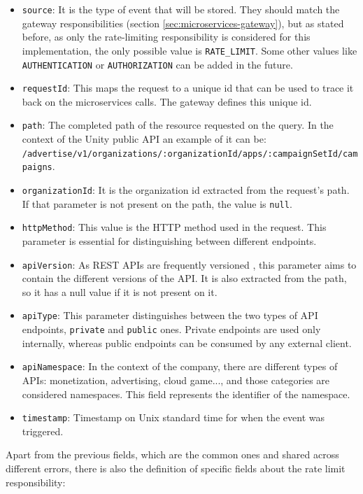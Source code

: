\documentclass[english, 12pt, a4paper, sci, utf8, a-1b, online]{aaltothesis}
\begin{document}
\begin{itemize}
    \item \texttt{source}: It is the type of event that will be stored. They should match the gateway responsibilities (section \ref{sec:microservices-gateway}), but as stated before, as only the rate-limiting responsibility is considered for this implementation, the only possible value is \texttt{RATE\_LIMIT}. Some other values like \texttt{AUTHENTICATION} or \texttt{AUTHORIZATION} can be added in the future.
    \item \texttt{requestId}: This maps the request to a unique id that can be used to trace it back on the microservices calls. The gateway defines this unique id.
    \item \texttt{path}: The completed path of the resource requested on the query. In the context of the Unity public API an example of it can be: \\ \texttt{/advertise/v1/organizations/:organizationId/apps/:campaignSetId/campaigns}.
    \item \texttt{organizationId}: It is the organization id extracted from the request's path. If that parameter is not present on the path, the value is \texttt{null}.
    \item \texttt{httpMethod}: This value is the HTTP method used in the request. This parameter is essential for distinguishing between different endpoints.
    \item \texttt{apiVersion}: As REST APIs are frequently versioned \cite{varga2016versioning}, this parameter aims to contain the different versions of the API. It is also extracted from the path, so it has a null value if it is not present on it.
    \item \texttt{apiType}: This parameter distinguishes between the two types of API endpoints, \texttt{private} and \texttt{public} ones. Private endpoints are used only internally, whereas public endpoints can be consumed by any external client.
    \item \texttt{apiNamespace}: In the context of the company, there are different types of APIs: monetization, advertising, cloud game..., and those categories are considered namespaces. This field represents the identifier of the namespace.
    \item \texttt{timestamp}: Timestamp on Unix standard time for when the event was triggered.
\end{itemize}

Apart from the previous fields, which are the common ones and shared across different errors, there is also the definition of specific fields about the rate limit responsibility:
\end{document}

